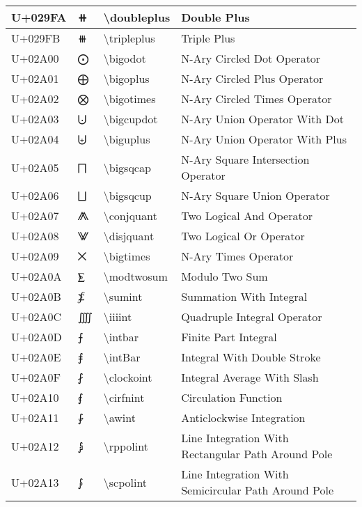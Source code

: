 \begin{table}[h]
\begin{tabulary}{\linewidth}{|L|L|L|L|}
\hline
U+029FA & ⧺ & {\textbackslash}doubleplus & Double Plus \\
\hline
U+029FB & ⧻ & {\textbackslash}tripleplus & Triple Plus \\
\hline
U+02A00 & ⨀ & {\textbackslash}bigodot & N-Ary Circled Dot Operator \\
\hline
U+02A01 & ⨁ & {\textbackslash}bigoplus & N-Ary Circled Plus Operator \\
\hline
U+02A02 & ⨂ & {\textbackslash}bigotimes & N-Ary Circled Times Operator \\
\hline
U+02A03 & ⨃ & {\textbackslash}bigcupdot & N-Ary Union Operator With Dot \\
\hline
U+02A04 & ⨄ & {\textbackslash}biguplus & N-Ary Union Operator With Plus \\
\hline
U+02A05 & ⨅ & {\textbackslash}bigsqcap & N-Ary Square Intersection Operator \\
\hline
U+02A06 & ⨆ & {\textbackslash}bigsqcup & N-Ary Square Union Operator \\
\hline
U+02A07 & ⨇ & {\textbackslash}conjquant & Two Logical And Operator \\
\hline
U+02A08 & ⨈ & {\textbackslash}disjquant & Two Logical Or Operator \\
\hline
U+02A09 & ⨉ & {\textbackslash}bigtimes & N-Ary Times Operator \\
\hline
U+02A0A & ⨊ & {\textbackslash}modtwosum & Modulo Two Sum \\
\hline
U+02A0B & ⨋ & {\textbackslash}sumint & Summation With Integral \\
\hline
U+02A0C & ⨌ & {\textbackslash}iiiint & Quadruple Integral Operator \\
\hline
U+02A0D & ⨍ & {\textbackslash}intbar & Finite Part Integral \\
\hline
U+02A0E & ⨎ & {\textbackslash}intBar & Integral With Double Stroke \\
\hline
U+02A0F & ⨏ & {\textbackslash}clockoint & Integral Average With Slash \\
\hline
U+02A10 & ⨐ & {\textbackslash}cirfnint & Circulation Function \\
\hline
U+02A11 & ⨑ & {\textbackslash}awint & Anticlockwise Integration \\
\hline
U+02A12 & ⨒ & {\textbackslash}rppolint & Line Integration With Rectangular Path Around Pole \\
\hline
U+02A13 & ⨓ & {\textbackslash}scpolint & Line Integration With Semicircular Path Around Pole \\
\hline

\end{tabulary}
\end{table}
